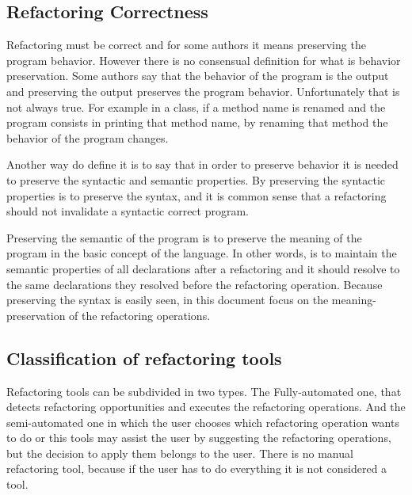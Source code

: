 \subsection{Refactoring Correctness}
Refactoring must be correct and for some authors it means preserving the program behavior. 
However there is no consensual definition for what is behavior preservation.
Some authors say that the behavior of the program is the output and preserving the output preserves the program behavior. 
Unfortunately that is not always true. 
For example in a class, if a method name is renamed and the program consists in printing that method name, by renaming that method the behavior of the program changes.

Another way do define it is to say that in order to preserve behavior it is needed to preserve the syntactic and semantic properties.
By preserving the syntactic properties is to preserve the syntax, and it is common sense that a refactoring should not invalidate a syntactic correct program.

Preserving the semantic of the program is to preserve the meaning of the program in the basic concept of the language. 
In other words, is to  maintain the semantic properties of all declarations after a refactoring and it should resolve to the same declarations they resolved before the refactoring operation.
Because preserving the syntax is easily seen, in this document focus on the meaning-preservation of the refactoring operations. 






\subsection{Classification of refactoring tools} %
Refactoring tools can be subdivided in two types.
The Fully-automated one, that detects refactoring opportunities and executes the refactoring operations. And the semi-automated one in which the user chooses which refactoring operation wants to do or this tools may assist the user by suggesting the refactoring operations, but the decision to apply them belongs to the user.
There is no manual refactoring tool, because if the user has to do everything it is not considered a tool.
